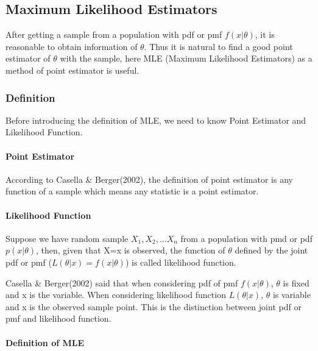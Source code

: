 \documentclass[
]{article}
\author{}
\date{\vspace{-2.5em}}
\begin{document}
{
\setcounter{tocdepth}{4}
\tableofcontents
}
\hypertarget{maximum-likelihood-estimators}{%
\subsection{Maximum Likelihood
Estimators}\label{maximum-likelihood-estimators}}

After getting a sample from a population with pdf or pmf
\(f(x|\theta)\), it is reasonable to obtain information of \(\theta\).
Thus it is natural to find a good point estimator of \(\theta\) with the
sample, here MLE (Maximum Likelihood Estimators) as a method of point
estimator is useful.

\hypertarget{definition}{%
\subsubsection{Definition}\label{definition}}

Before introducing the definition of MLE, we need to know Point
Estimator and Likelihood Function.

\hypertarget{point-estimator}{%
\paragraph{Point Estimator}\label{point-estimator}}

According to Casella \& Berger(2002), the definition of point estimator
is any function of a sample which means any statistic is a point
estimator.

\hypertarget{likelihood-function}{%
\paragraph{Likelihood Function}\label{likelihood-function}}

Suppose we have random sample \(X_1,X_2,...X_n\) from a population with
pmd or pdf \(p(x|\theta)\), then, given that X=x is observed, the
function of \(\theta\) defined by the joint pdf or pmf
(\(L(\theta|x)=f(x|\theta)\)) is called likelihood function.

Casella \& Berger(2002) said that when considering pdf of pmf
\(f(x|\theta)\), \(\theta\) is fixed and x is the variable. When
considering likelihood function \(L(\theta|x)\), \(\theta\) is variable
and x is the observed sample point. This is the distinction between
joint pdf or pmf and likelihood function.

\hypertarget{definition-of-mle}{%
\paragraph{Definition of MLE}\label{definition-of-mle}}
\end{document}
